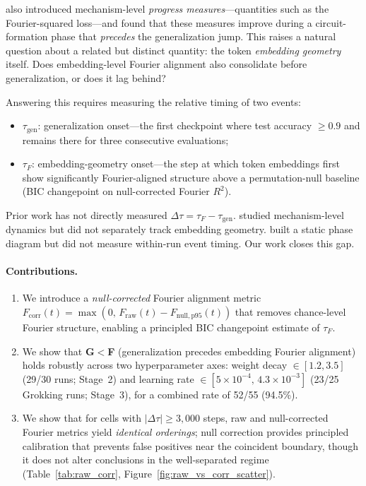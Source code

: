 \documentclass{article}
\newcommand{\taug}{\tau_{\mathrm{gen}}}
\newcommand{\tauf}{\tau_{F}}
\newcommand{\Dtau}{\Delta\tau}
\newcommand{\fcorr}{F_{\mathrm{corr}}}
\begin{document}
\citet{nanda2023progress} also introduced mechanism-level
\emph{progress measures}---quantities such as the Fourier-squared
loss---and found that these measures improve during a circuit-formation
phase that \emph{precedes} the generalization jump.
This raises a natural question about a related but distinct quantity:
the token \emph{embedding geometry} itself.
Does embedding-level Fourier alignment also consolidate before
generalization, or does it lag behind?

Answering this requires measuring the relative timing of two events:
\begin{itemize}
  \item $\taug$: generalization onset---the first checkpoint where
    test accuracy $\geq 0.9$ and remains there for three consecutive
    evaluations;
  \item $\tauf$: embedding-geometry onset---the step at which token
    embeddings first show significantly Fourier-aligned structure
    above a permutation-null baseline (BIC changepoint on
    null-corrected Fourier $R^2$).
\end{itemize}

Prior work has not directly measured $\Dtau = \tauf - \taug$.
\citet{nanda2023progress} studied mechanism-level dynamics but did not
separately track embedding geometry.
\citet{liu2022towards} built a static phase diagram but did not
measure within-run event timing.
Our work closes this gap.

\paragraph{Contributions.}
\begin{enumerate}
  \item We introduce a \emph{null-corrected} Fourier alignment metric
    $\fcorr(t) = \max(0,\, F_{\mathrm{raw}}(t) -
    F_{\mathrm{null,p95}}(t))$ that removes chance-level Fourier
    structure, enabling a principled BIC changepoint estimate of
    $\tauf$.

  \item We show that \textbf{G$<$F} (generalization precedes embedding
    Fourier alignment) holds robustly across two hyperparameter axes:
    weight decay $\in[1.2,3.5]$ (29/30 runs; Stage~2) and
    learning rate $\in[5\times10^{-4},\,4.3\times10^{-3}]$ (23/25
    Grokking runs; Stage~3), for a combined rate of 52/55 (94.5\%).

  \item We show that for cells with $|\Delta\tau|\ge3{,}000$ steps,
    raw and null-corrected Fourier metrics yield \emph{identical orderings};
    null correction provides principled calibration that prevents false
    positives near the coincident boundary, though it does not alter
    conclusions in the well-separated regime (Table~\ref{tab:raw_corr},
    Figure~\ref{fig:raw_vs_corr_scatter}).
\end{enumerate}
\end{document}
